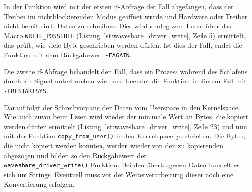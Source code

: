 In der Funktion wird mit der ersten if-Abfrage der Fall abgefangen, dass der Treiber im nichtblockierenden Modus geöffnet wurde und Hardware oder Treiber nicht bereit sind, Daten zu schreiben. Dies wird analog zum Lesen über das Macro \texttt{WRITE\_POSSIBLE} (Listing \ref{lst:waveshare_driver_write}, Zeile 5) ermittelt, das prüft, wie viele Byte geschrieben werden dürfen. Ist dies der Fall, endet die Funktion mit dem Rückgabewert \texttt{-EAGAIN}.

Die zweite if-Abfrage behandelt den Fall, dass ein Prozess während des Schlafens durch ein Signal unterbrochen wird und beendet die Funktion in diesem Fall mit \texttt{-ERESTARTSYS}.

Darauf folgt der Schreibvorgang der Daten vom Userspace in den Kernelspace. Wie auch zuvor beim Lesen wird wieder der minimale Wert an Bytes, die kopiert werden dürfen ermittelt (Listing \ref{lst:waveshare_driver_write}, Zeile 23) und nun mit der Funktion \texttt{copy_from_user()} in den Kernelspace geschrieben. Die Bytes, die nicht kopiert werden konnten, werden wieder von den zu kopierenden abgezogen und bilden so den Rückgabewert der \\ \texttt{waveshare_driver_write()} Funktion. Bei den übertragenen Daten handelt es sich um Strings. Eventuell muss vor der Weiterverarbeitung dieser noch eine Konvertierung erfolgen.


